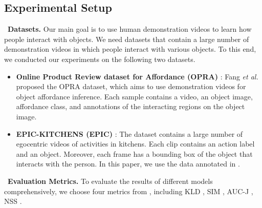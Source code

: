 \documentclass[journal,twoside]{IEEEtran}
\newcommand{\myPara}[1]{\vspace{5pt}\noindent~\textbf{#1} \quad}
\def\etal{{\em et al.~}}
\begin{document}
\subsection{Experimental Setup}

\myPara{Datasets.}
Our main goal is to use human demonstration videos to learn how people interact with objects. We need datasets that contain a large number of demonstration videos in which people interact with various objects. To this end, we conducted our experiments on the following two datasets.

\begin{itemize}

\item [] 
\textbf{Online Product Review dataset for Affordance (OPRA)} \cite{demo2vec2018cvpr}: Fang \etal \cite{demo2vec2018cvpr} proposed the OPRA dataset, which aims to use demonstration videos for object affordance inference. Each sample contains a video, an object image, affordance class, and annotations of the interacting regions on the object image.

\item [] 
\textbf{EPIC-KITCHENS (EPIC)} \cite{Damen2018EPICKITCHENS}: The dataset contains a large number of egocentric videos of activities in kitchens. Each clip contains an action label and an object. Moreover, each frame has a bounding box of the object that interacts with the person. In this paper, we use the data annotated in \cite{interaction-hotspots}.

\end{itemize}

\myPara{Evaluation Metrics.}
To evaluate the results of different models comprehensively, we choose four metrics from \cite{bylinskii2018different}, including KLD \cite{bylinskii2018different}, SIM \cite{swain1991color}, AUC-J \cite{DBLP:conf/iccv/JuddEDT09}, NSS \cite{peters2005components}.
\end{document}
